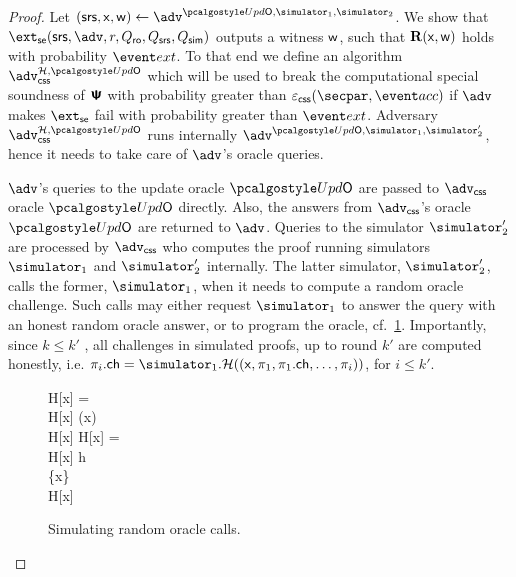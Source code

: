 \begin{proof}	
	Let $(\srs, \inp, \wit) \gets \advse^{\initU, \simulator_1, \simulator_2}$. We show that $\extse (\srs, \advse, r, \Qro, \Qsrs, \Qsim)$ outputs a witness $\mathsf{w}$, such that $\mathbf{R}(\mathsf{x}, \mathsf{w})$ holds with probability $\extProb$. To that end we define an algorithm $\advcss^{\ro, \initU}$ which will be used to break the computational special soundness of $\bm{\mathsf{\Psi}}$ with probability greater than $\epscss(\secpar, \accProb)$ if $\advse$ makes $\extse$ fail with probability greater than $\extProb$. %
%
	Adversary $\advcss^{\ro, \initU}$ runs internally $\advse^{\initU, \simulator_1, \simulator'_2}$, hence it needs to take care of $\advse$'s oracle queries. %

	$\advse$'s queries to the update oracle $\initU$ are passed to $\advcss$ oracle $\initU$ directly. Also, the answers from $\advcss$'s oracle $\initU$ are returned to $\advse$.
	Queries to the simulator $\simulator'_2$ are processed by $\advcss$ who computes the proof running simulators $\simulator_1$ and $\simulator'_2$ internally. The latter simulator, $\simulator'_{2}$, calls the former,  $\simulator_{1}$, when it needs to compute a random oracle challenge. Such calls may either request $\simulator_{1}$ to answer the query with an honest random oracle answer, or to program the oracle, cf.~\cref{fig:simulator_oracles}. Importantly, since $k \leq k'$ , all challenges in simulated proofs, up to round $k'$ are computed honestly, i.e. $\zkproof_{i}.\ch = \simulator_{1}.\ro((\inp, \zkproof_1, \zkproof_1.\ch, \ldots, \zkproof_{i}))$, for $i \leq k'$.
	\begin{figure}
		\centering
			\begin{pcvstack}
			\begin{pchstack}
				{
				\pcif H[x] = \bot \pcthen \\
				\pcind H[x] \gets \ro(x) \\
				\pcreturn H[x]
		  		}
				\pchspace
				{ 
					\pcif H[x] = \bot \pcthen \\ 
					\pcind H[x] \gets h \\
					\pcind \Qprog \gets \Qprog \cup \{x\}\\
					\pcreturn H[x]
				}
			\end{pchstack}
		\end{pcvstack}
		\caption{Simulating random oracle calls.}
		\label{fig:simulator_oracles}
	\end{figure}	


\end{proof}
